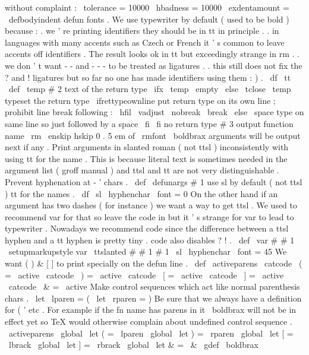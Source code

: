 {{{{without
complaint
:
\
tolerance
=
10000
\
hbadness
=
10000
\
exdentamount
=
\
defbodyindent
{
%
%
defun
fonts
.
We
use
typewriter
by
default
(
used
to
be
bold
)
because
:
%
.
we
'
re
printing
identifiers
they
should
be
in
tt
in
principle
.
%
.
in
languages
with
many
accents
such
as
Czech
or
French
it
'
s
%
common
to
leave
accents
off
identifiers
.
The
result
looks
ok
in
%
tt
but
exceedingly
strange
in
rm
.
%
.
we
don
'
t
want
-
-
and
-
-
-
to
be
treated
as
ligatures
.
%
.
this
still
does
not
fix
the
?
and
!
ligatures
but
so
far
no
%
one
has
made
identifiers
using
them
:
)
.
\
df
\
tt
\
def
\
temp
{
#
2
}
%
text
of
the
return
type
\
ifx
\
temp
\
empty
\
else
\
tclose
{
\
temp
}
%
typeset
the
return
type
\
ifrettypeownline
%
put
return
type
on
its
own
line
;
prohibit
line
break
following
:
\
hfil
\
vadjust
{
\
nobreak
}
\
break
\
else
\
space
%
type
on
same
line
so
just
followed
by
a
space
\
fi
\
fi
%
no
return
type
#
3
%
output
function
name
}
%
{
\
rm
\
enskip
}
%
hskip
0
.
5
em
of
\
rmfont
%
\
boldbrax
%
arguments
will
be
output
next
if
any
.
}
%
Print
arguments
in
slanted
roman
(
not
ttsl
)
inconsistently
with
using
%
tt
for
the
name
.
This
is
because
literal
text
is
sometimes
needed
in
%
the
argument
list
(
groff
manual
)
and
ttsl
and
tt
are
not
very
%
distinguishable
.
Prevent
hyphenation
at
-
'
chars
.
%
\
def
\
defunargs
#
1
{
%
%
use
sl
by
default
(
not
ttsl
)
%
tt
for
the
names
.
\
df
\
sl
\
hyphenchar
\
font
=
0
%
%
On
the
other
hand
if
an
argument
has
two
dashes
(
for
instance
)
we
%
want
a
way
to
get
ttsl
.
We
used
to
recommend
var
for
that
so
%
leave
the
code
in
but
it
'
s
strange
for
var
to
lead
to
typewriter
.
%
Nowadays
we
recommend
code
since
the
difference
between
a
ttsl
hyphen
%
and
a
tt
hyphen
is
pretty
tiny
.
code
also
disables
?
!
.
\
def
\
var
#
#
1
{
{
\
setupmarkupstyle
{
var
}
\
ttslanted
{
#
#
1
}
}
}
%
#
1
%
\
sl
\
hyphenchar
\
font
=
45
}
%
We
want
(
)
&
[
]
to
print
specially
on
the
defun
line
.
%
\
def
\
activeparens
{
%
\
catcode
\
(
=
\
active
\
catcode
\
)
=
\
active
\
catcode
\
[
=
\
active
\
catcode
\
]
=
\
active
\
catcode
\
&
=
\
active
}
%
Make
control
sequences
which
act
like
normal
parenthesis
chars
.
\
let
\
lparen
=
(
\
let
\
rparen
=
)
%
Be
sure
that
we
always
have
a
definition
for
(
'
etc
.
For
example
%
if
the
fn
name
has
parens
in
it
\
boldbrax
will
not
be
in
effect
yet
%
so
TeX
would
otherwise
complain
about
undefined
control
sequence
.
{
\
activeparens
\
global
\
let
(
=
\
lparen
\
global
\
let
)
=
\
rparen
\
global
\
let
[
=
\
lbrack
\
global
\
let
]
=
\
rbrack
\
global
\
let
&
=
\
&
\
gdef
\
boldbrax
{
\
}}}}}
